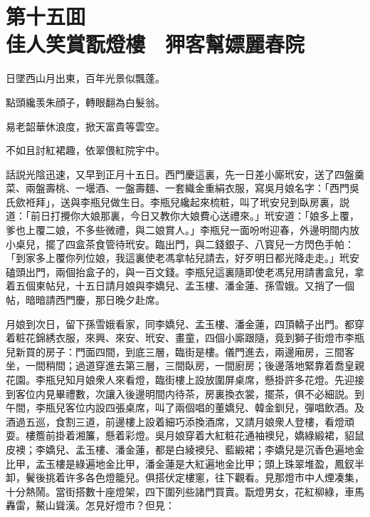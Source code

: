 
\chapter*{第十五囬　\\佳人笑賞翫燈樓　狎客幫嫖麗春院}


\begin{myquote}
日墜西山月出東，百年光景似飄蓬。

點頭纔羡朱顔子，轉眼翻為白髮翁。

易老韶華休浪度，掀天富貴等雲空。

不如且討紅裙趣，依翠偎紅院宇中。
\end{myquote}

話説光陰迅速，又早到正月十五日。西門慶這裏，先一日差小廝玳安，送了四盤羹菜、兩盤壽桃、一壜酒、一盤壽麵、一套織金重絹衣服，寫吳月娘名字：「西門吳氏歛袵拜」，送與李瓶兒做生日。李瓶兒纔起來梳粧，叫了玳安兒到臥房裏，説道：「前日打攪你大娘那裏，今日又教你大娘費心送禮來。」玳安道：「娘多上覆，爹也上覆二娘，不多些微禮，與二娘賞人。」李瓶兒一面吩咐迎春，外邊明間内放小桌兒，擺了四盒茶食管待玳安。臨出門，與二錢銀子、八寳兒一方閃色手帕：「到家多上覆你列位娘，我這裏使老馮拿帖兒請去，好歹明日都光降走走。」玳安磕頭出門，兩個抬盒子的，與一百文錢。李瓶兒這裏隨即使老馮兒用請書盒兒，拿着五個柬帖兒，十五日請月娘與李嬌兒、孟玉樓、潘金蓮、孫雪娥。又捎了一個帖，暗暗請西門慶，那日晚夕赴席。

月娘到次日，留下孫雪娥看家，同李嬌兒、孟玉樓、潘金蓮，四頂轎子出門。都穿着粧花錦綉衣服，來興、來安、玳安、畫童，四個小廝跟隨，竟到獅子街燈市李瓶兒新買的房子：門面四間，到底三層，臨街是樓。儀門進去，兩邊廂房，三間客坐，一間稍間；過道穿進去第三層，三間臥房，一間廚房；後邊落地緊靠着喬皇親花園。李瓶兒知月娘衆人來看燈，臨街樓上設放圍屏桌席，懸掛許多花燈。先迎接到客位内見畢禮數，次讓入後邊明間内待茶，房裏換衣裳，擺茶，俱不必細説。到午間，李瓶兒客位内設四張桌席，叫了兩個唱的董嬌兒、韓金釧兒，彈唱飲酒。及酒過五巡，食割三道，前邊樓上設着細巧添換酒席，又請月娘衆人登樓，看燈頑耍。樓簷前掛着湘簾，懸着彩燈。吳月娘穿着大紅粧花通袖襖兒，嬌綠緞裙，貂鼠皮襖；李嬌兒、孟玉樓、潘金蓮，都是白綾襖兒、藍緞裙；李嬌兒是沉香色遍地金比甲，孟玉樓是綠遍地金比甲，潘金蓮是大紅遍地金比甲；頭上珠翠堆盈，鳳釵半卸，鬢後挑着许多各色燈籠兒。俱搭伏定樓窻，往下觀看。見那燈市中人煙凑集，十分熱鬧。當街搭數十座燈架，四下圍列些諸門買賣。翫燈男女，花紅柳綠，車馬轟雷，鰲山聳漢。怎見好燈市？但見：

